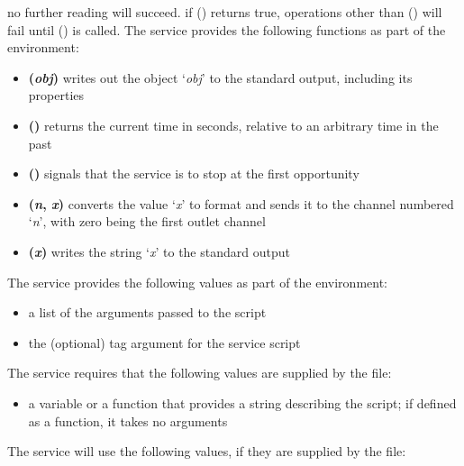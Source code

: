 no further reading will succeed.
if () returns true, operations other than () will fail
until () is called.
\tertiaryEnd
\secondaryEnd
{}
The \JSF{} service provides the following functions as part of the \JS{} environment:
\begin{itemize}
\item\textbf{(\textit{obj})} \longDash{} writes out the object
`\textit{obj}' to the standard output, including its properties
\item\exSp\textbf{()} \longDash{} returns the current time in seconds, relative
to an arbitrary time in the past
\item\exSp\textbf{()} \longDash{} signals that the service is to stop
at the first opportunity
\item\exSp\textbf{(\textit{n}, \textit{x})} \longDash{} converts the
value `\textit{x}' to \yarp{} format and sends it to the channel numbered `\textit{n}',
with zero being the first outlet channel
\item\exSp\textbf{(\textit{x})} \longDash{} writes the string
`\textit{x}' to the standard output
\end{itemize}
\secondaryEnd
{}
The \JSF{} service provides the following values as part of the \JS{} environment:
\begin{itemize}
\item\textbf{\openSq\closeSq} \longDash{} a list of the arguments passed
to the script
\item\exSp\textbf{} \longDash{} the (optional) tag argument for the service
script
\end{itemize}
\secondaryEnd
{}
The \JSF{} service requires that the following values are supplied by the \JS{} file:
\begin{itemize}
\item\textbf{} \longDash{} a variable or a function that
provides a string describing the script; if defined as a function, it takes no arguments
\end{itemize}
\secondaryEnd
{}
The \JSF{} service will use the following values, if they are supplied by the \JS{} file:
